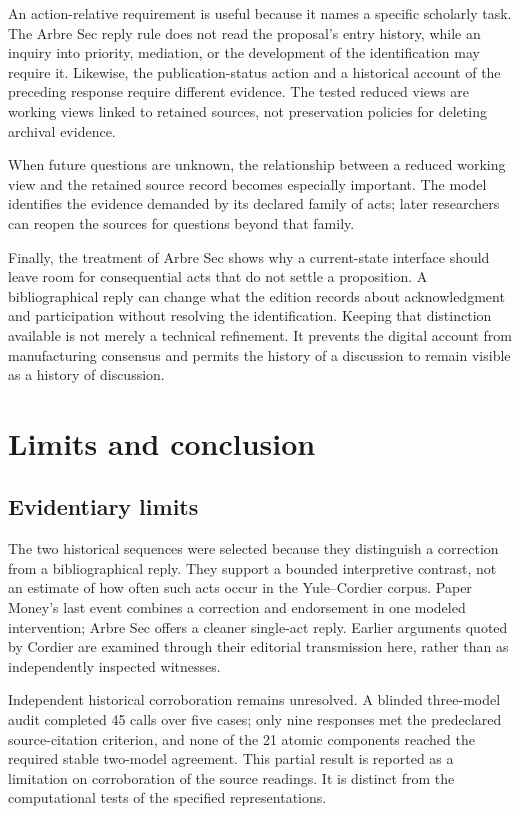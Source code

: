 \documentclass[11pt,a4paper]{article}
\begin{document}
An action-relative requirement is useful because it names a specific scholarly task. The Arbre Sec reply rule does not read the proposal's entry history, while an inquiry into priority, mediation, or the development of the identification may require it. Likewise, the publication-status action and a historical account of the preceding response require different evidence. The tested reduced views are working views linked to retained sources, not preservation policies for deleting archival evidence.


When future questions are unknown, the relationship between a reduced working view and the retained source record becomes especially important. The model identifies the evidence demanded by its declared family of acts; later researchers can reopen the sources for questions beyond that family.


Finally, the treatment of Arbre Sec shows why a current-state interface should leave room for consequential acts that do not settle a proposition. A bibliographical reply can change what the edition records about acknowledgment and participation without resolving the identification. Keeping that distinction available is not merely a technical refinement. It prevents the digital account from manufacturing consensus and permits the history of a discussion to remain visible as a history of discussion.


\section{Limits and conclusion}

\subsection{Evidentiary limits}

The two historical sequences were selected because they distinguish a correction from a bibliographical reply. They support a bounded interpretive contrast, not an estimate of how often such acts occur in the Yule–Cordier corpus. Paper Money's last event combines a correction and endorsement in one modeled intervention; Arbre Sec offers a cleaner single-act reply. Earlier arguments quoted by Cordier are examined through their editorial transmission here, rather than as independently inspected witnesses.


Independent historical corroboration remains unresolved. A blinded three-model audit completed 45 calls over five cases; only nine responses met the predeclared source-citation criterion, and none of the 21 atomic components reached the required stable two-model agreement. This partial result is reported as a limitation on corroboration of the source readings. It is distinct from the computational tests of the specified representations.
\end{document}
